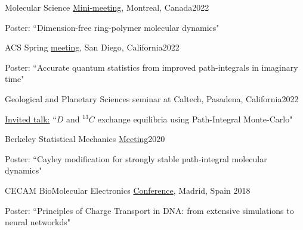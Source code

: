 \documentclass[margin,line]{res}
\newenvironment{list1}{
  \begin{list}{\ding{113}}{%
      \setlength{\itemsep}{0in}
      \setlength{\parsep}{0in} \setlength{\parskip}{0in}
      \setlength{\topsep}{0in} \setlength{\partopsep}{0in} 
      \setlength{\leftmargin}{0.17in}}}{\end{list}}
\begin{document}
\begin{resume}
Molecular Science \href{https://www.siminegroup.ca/mms/mms2022}{Mini-meeting}, Montreal, Canada\hfill{2022}

\begin{list1}
\item[]Poster: ``Dimension-free ring-polymer molecular dynamics"
\end{list1}

\vspace*{-2.5mm}

ACS Spring \href{https://www.morressier.com/o/event/623377e0b300ee00119b311f}{meeting}, San Diego, California\hfill{2022}

\begin{list1}
\item[]Poster: ``Accurate quantum statistics from improved path-integrals in imaginary time"
\end{list1}

\vspace*{-2.5mm}

Geological and Planetary Sciences seminar at Caltech, Pasadena, California\hfill{2022}

\begin{list1}
\item[]\underline{Invited talk:} ``$D$ and $^{13}C$ exchange equilibria using Path-Integral Monte-Carlo"
\end{list1}

\vspace*{-2.5mm}

Berkeley Statistical Mechanics  \href{http://berkeleystatmech.org/}{Meeting}\hfill{2020}

\begin{list1}
\item[]Poster: ``Cayley modification for strongly stable path-integral molecular dynamics"
\end{list1}

\vspace*{-2.5mm}

CECAM BioMolecular Electronics \href{https://www.cecam.org/workshop-details/cecampsi-k-research-conference-biomolecular-electronics-biomolectro-246}{Conference}, Madrid, Spain \hfill {2018}

\begin{list1}
\item[]Poster: ``Principles of Charge Transport in DNA: from extensive simulations to neural networkds"
\end{list1}

\vspace*{-2.5mm}


\end{resume}
\end{document}
